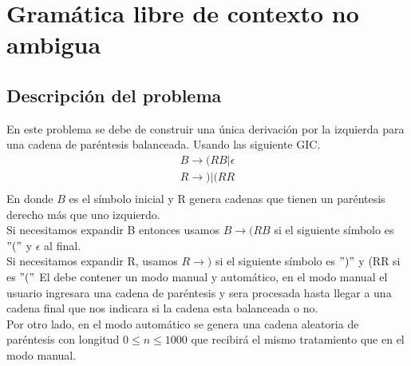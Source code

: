 \section{Gramática libre de contexto no ambigua}
	\subsection{Descripción del problema}
	En este problema se debe de construir una única derivación por la izquierda para una cadena de paréntesis balanceada. Usando las siguiente GIC.
	\begin{gather*}
	B \to (RB | \epsilon \\
	R \to ) |  (RR \\
	\end{gather*}
	En donde $B$ es el símbolo inicial y R genera cadenas que tienen un paréntesis derecho más que uno izquierdo.
	\\Si necesitamos expandir B entonces usamos $B \to (RB $ si el siguiente símbolo es $"("$ y $\epsilon$ al final.
	\\Si necesitamos expandir R, usamos $R \to ) $ si el siguiente símbolo es $")"$ y (RR si es $"("$ \cite{WEB}
	El debe contener un modo manual y automático, en el modo manual el usuario ingresara una cadena de paréntesis y sera procesada hasta llegar a una cadena final que nos indicara si la cadena esta balanceada o no.
	\\Por otro lado, en el modo automático se genera una cadena aleatoria de paréntesis con longitud $0 \le n \le 1000 $ que recibirá el mismo tratamiento que en el modo manual.
